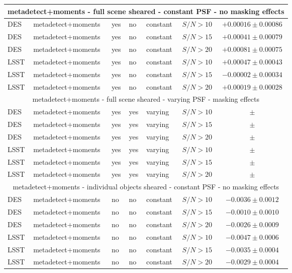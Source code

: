 \documentclass[fleqn,useAMS,usenatbib]{mnras}
\newcommand{\snr}{$S/N$}
\begin{document}
\begin{table}
\begin{tabular}{|l|l|l|l|l|c|c|}
    \hline
    \multicolumn{7}{c}{metadetect+moments - full scene sheared - constant PSF - no masking effects}\\
    \hline
    DES   & metadetect+moments & yes & no & constant & \snr$ > 10$ & $+0.00016 \pm 0.00086$  \\
    DES   & metadetect+moments & yes & no & constant & \snr$ > 15$ & $+0.00041 \pm 0.00079$  \\
    DES   & metadetect+moments & yes & no & constant & \snr$ > 20$ & $+0.00081 \pm 0.00075$  \\
    \hline
    LSST  & metadetect+moments & yes & no & constant & \snr$ > 10$ & $+0.00047 \pm 0.00043$  \\
    LSST  & metadetect+moments & yes & no & constant & \snr$ > 15$ & $-0.00002 \pm 0.00034$  \\
    LSST  & metadetect+moments & yes & no & constant & \snr$ > 20$ & $+0.00019 \pm 0.00028$  \\
    \hline

    \hline
    \multicolumn{7}{c}{metadetect+moments - full scene sheared - varying PSF - masking effects}\\
    \hline
    DES   & metadetect+moments & yes & yes & varying & \snr$ > 10$ & $\pm$  \\
    DES   & metadetect+moments & yes & yes & varying & \snr$ > 15$ & $\pm$  \\
    DES   & metadetect+moments & yes & yes & varying & \snr$ > 20$ & $\pm$  \\
    \hline
    LSST  & metadetect+moments & yes & yes & varying & \snr$ > 10$ & $\pm$  \\
    LSST  & metadetect+moments & yes & yes & varying & \snr$ > 15$ & $\pm$  \\
    LSST  & metadetect+moments & yes & yes & varying & \snr$ > 20$ & $\pm$  \\
    \hline

    \hline
    \multicolumn{7}{c}{metadetect+moments - individual objects sheared - constant PSF - no masking effects}\\
    \hline
    DES   & metadetect+moments & no & no & constant & \snr$ > 10$ & $-0.0036 \pm 0.0012$  \\
    DES   & metadetect+moments & no & no & constant & \snr$ > 15$ & $-0.0010 \pm 0.0010$  \\
    DES   & metadetect+moments & no & no & constant & \snr$ > 20$ & $-0.0026 \pm 0.0009$  \\
    \hline
    LSST  & metadetect+moments & no & no & constant & \snr$ > 10$ & $-0.0047 \pm 0.0006$  \\
    LSST  & metadetect+moments & no & no & constant & \snr$ > 15$ & $-0.0035 \pm 0.0004$  \\
    LSST  & metadetect+moments & no & no & constant & \snr$ > 20$ & $-0.0029 \pm 0.0004$  \\
    \hline
  \end{tabular}

\end{table}
\end{document}
